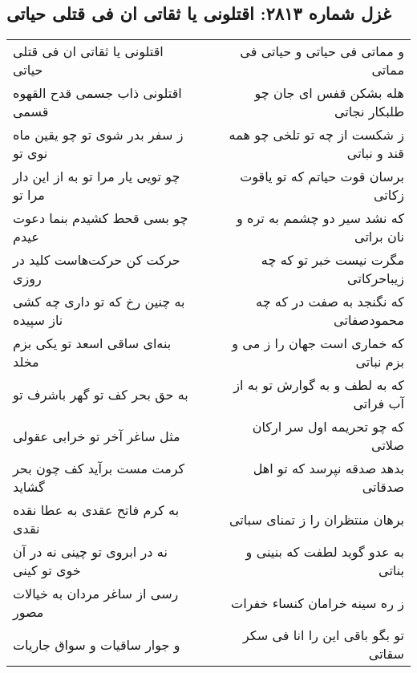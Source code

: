 \begin{center}
\section*{غزل شماره ۲۸۱۳: اقتلونی یا ثقاتی ان فی قتلی حیاتی}
\label{sec:2813}
\begin{longtable}{l p{0.5cm} r}
اقتلونی یا ثقاتی ان فی قتلی حیاتی
&&
و مماتی فی حیاتی و حیاتی فی مماتی
\\
اقتلونی ذاب جسمی قدح القهوه قسمی
&&
هله بشکن قفس ای جان چو طلبکار نجاتی
\\
ز سفر بدر شوی تو چو یقین ماه نوی تو
&&
ز شکست از چه تو تلخی چو همه قند و نباتی
\\
چو تویی یار مرا تو به از این دار مرا تو
&&
برسان قوت حیاتم که تو یاقوت زکاتی
\\
چو بسی قحط کشیدم بنما دعوت عیدم
&&
که نشد سیر دو چشمم به تره و نان براتی
\\
حرکت کن حرکت‌هاست کلید در روزی
&&
مگرت نیست خبر تو که چه زیباحرکاتی
\\
به چنین رخ که تو داری چه کشی ناز سپیده
&&
که نگنجد به صفت در که چه محمودصفاتی
\\
بنه‌ای ساقی اسعد تو یکی بزم مخلد
&&
که خماری است جهان را ز می و بزم نباتی
\\
به حق بحر کف تو گهر باشرف تو
&&
که به لطف و به گوارش تو به از آب فراتی
\\
مثل ساغر آخر تو خرابی عقولی
&&
که چو تحریمه اول سر ارکان صلاتی
\\
کرمت مست برآید کف چون بحر گشاید
&&
بدهد صدقه نپرسد که تو اهل صدقاتی
\\
به کرم فاتح عقدی به عطا نقده نقدی
&&
برهان منتظران را ز تمنای سباتی
\\
نه در ابروی تو چینی نه در آن خوی تو کینی
&&
به عدو گوید لطفت که بنینی و بناتی
\\
رسی از ساغر مردان به خیالات مصور
&&
ز ره سینه خرامان کنساء خفرات
\\
و جوار ساقیات و سواق جاریات
&&
تو بگو باقی این را انا فی سکر سقاتی
\\
\end{longtable}
\end{center}
